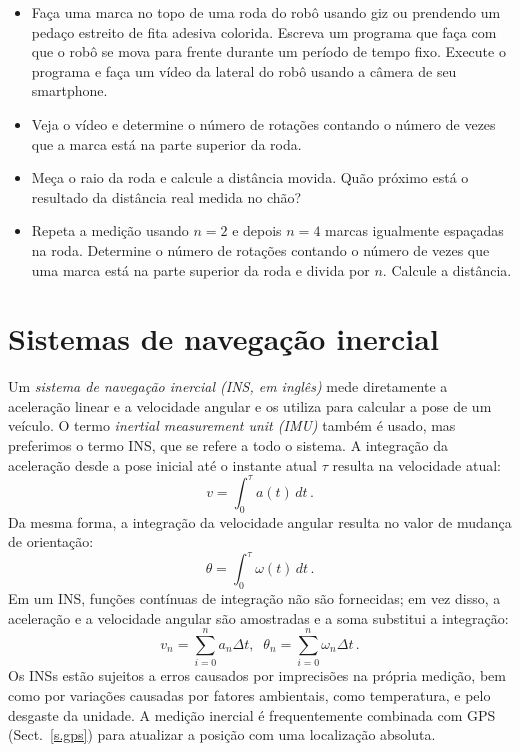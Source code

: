 \begin{framed}
\begin{itemize}
\item Faça uma marca no topo de uma roda do robô usando giz ou prendendo um pedaço estreito de fita adesiva colorida. Escreva um programa que faça com que o robô se mova para frente durante um período de tempo fixo. Execute o programa e faça um vídeo da lateral do robô usando a câmera de seu smartphone.
\item Veja o vídeo e determine o número de rotações contando o número de vezes que a marca está na parte superior da roda.
\item Meça o raio da roda e calcule a distância movida. Quão próximo está o resultado da distância real medida no chão?
\item Repeta a medição usando $n=2$ e depois $n=4$ marcas igualmente espaçadas na roda. Determine o número de rotações contando o número de vezes que uma marca está na parte superior da roda e divida por $n$. Calcule a distância.
\end{itemize}
\end{framed}

\section{Sistemas de navegação inercial}\label{s.imu}

Um \emph{sistema de navegação inercial (INS, em inglês)} mede diretamente a aceleração linear e a velocidade angular e os utiliza para calcular a pose de um veículo. O termo \emph{inertial measurement unit (IMU)} também é usado, mas preferimos o termo INS, que se refere a todo o sistema. A integração da aceleração desde a pose inicial até o instante atual $\tau$ resulta na velocidade atual:
\[
v=\int_0^\tau a(t) \,dt\,.
\]
Da mesma forma, a integração da velocidade angular resulta no valor de mudança de orientação:
\[
\theta = \int_0^\tau \omega(t) \, dt\,.
\]
Em um INS, funções contínuas de integração não são fornecidas; em vez disso, a aceleração e a velocidade angular são amostradas e a soma substitui a integração:
\[
v_n = \sum^{n}_{i=0} a_n \Delta t,\;\; \theta_n = \sum^{n}_{i=0} \omega_n \Delta t\,.
\]
Os INSs estão sujeitos a erros causados por imprecisões na própria medição, bem como por variações causadas por fatores ambientais, como temperatura, e pelo desgaste da unidade. A medição inercial é frequentemente combinada com GPS (Sect.~\ref{s.gps}) para atualizar a posição com uma localização absoluta.

